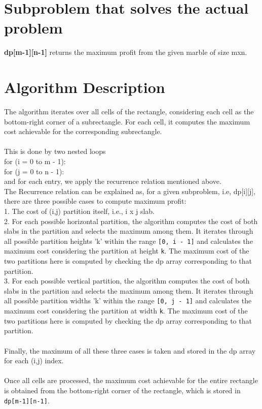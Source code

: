 \documentclass{article}
\begin{document}
\section{Subproblem that solves the actual problem}
\textbf{dp[m-1][n-1]} \textrightarrow \hspace{1pt} returns the maximum profit from the given marble of size mxn.


\section{Algorithm Description}
The algorithm iterates over all cells of the rectangle, considering each cell as the bottom-right corner of a subrectangle. For each cell, it computes the maximum cost achievable for the corresponding subrectangle. \\
\\
This is done by two nested loops\\ for (i = 0 to m - 1):\\
\-\hspace{20pt} for (j = 0 to n - 1):\\
\-\hspace{40pt}and for each entry, we apply the recurrence relation mentioned above.\\
The Recurrence relation can be explained as, for a given subproblem, i.e, dp[i][j], there are three possible cases to compute maximum profit:\\
1. The cost of (i,j) partition itself, i.e., i x j slab.\\
2. For each possible horizontal partition, the algorithm computes the cost of both slabs in the partition and selects the maximum among them. It iterates through all possible partition heights 'k' within the range \verb|[0, i - 1]| and calculates the maximum cost considering the partition at height \verb|k|. The maximum cost of the two partitions here is computed by checking the dp array corresponding to that partition.\\
3. For each possible vertical partition, the algorithm computes the cost of both slabs in the partition and selects the maximum among them. It iterates through all possible partition widths 'k' within the range \verb|[0, j - 1]| and calculates the maximum cost considering the partition at width \verb|k|. The maximum cost of the two partitions here is computed by checking the dp array corresponding to that partition.\\
\\
Finally, the maximum of all these three cases is taken and stored in the dp array for each (i,j) index.\\
\\
Once all cells are processed, the maximum cost achievable for the entire rectangle is obtained from the bottom-right corner of the rectangle, which is stored in \verb|dp[m-1][n-1]|. \\
\end{document}
